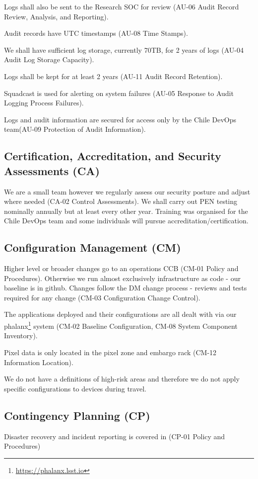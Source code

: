 Logs shall also be sent to the Research SOC for review (AU-06  Audit Record Review, Analysis, and Reporting).

Audit records have UTC timestamps (AU-08  Time Stamps).

We shall have sufficient log storage, currently 70TB,  for 2 years of logs (AU-04  Audit Log Storage Capacity).

Logs shall be kept for at least 2 years (AU-11  Audit Record Retention).

Squadcast is used for alerting on system failures (AU-05  Response to Audit Logging Process Failures).

Logs and audit information are secured for access only by the Chile DevOps team(AU-09  Protection of Audit Information).


\subsection{Certification, Accreditation, and Security Assessments (CA)} \label{sec:CA}
We are a small team however we regularly assess our security posture and adjust where needed (CA-02  Control Assessments).
We shall carry out PEN testing nominally annually but at least every other year.
Training was organised for the Chile DevOps team and some individuals will pursue accreditation/certification.

\subsection{Configuration Management (CM)} \label{sec:CM}

Higher level or broader changes go to an operations CCB  (CM-01  Policy and Procedures).
Otherwise we run almost exclusively infrastructure as code - our baseline is in github.
Changes follow the DM change process - reviews and tests required for any change (CM-03  Configuration Change Control).


The applications deployed and their configurations are all dealt with via our phalanx\footnote{\url{https://phalanx.lsst.io}} system (CM-02  Baseline Configuration, CM-08  System Component Inventory).

Pixel data is only located in the pixel zone and embargo rack (CM-12  Information Location).


We do not have a definitions of high-risk areas and therefore we do not apply specific configurations to devices during travel.

\subsection{Contingency Planning (CP)} \label{sec:CP}
Disaster recovery and incident reporting is covered in  (CP-01  Policy and Procedures)

